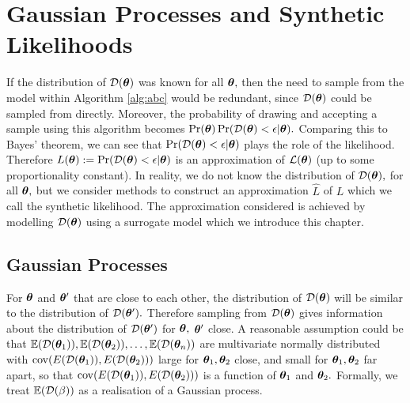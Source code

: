 \chapter{Gaussian Processes and Synthetic Likelihoods}

If the distribution of $\mathcal{D}(\bm{\theta})$ was known for all $\bm{\theta},$ then the need
to sample from the model within Algorithm
\ref{alg:abc} would be redundant, since $\mathcal{D}(\bm{\theta})$ could be sampled from
directly. Moreover, the probability of drawing and accepting a sample
using this algorithm becomes
$\Pr(\bm{\theta})\Pr(\mathcal{D}(\bm{\theta}) < \epsilon | \bm{\theta}).$ Comparing
this to Bayes' theorem, we can see that $\Pr(\mathcal{D}(\bm{\theta}) < \epsilon | \bm{\theta})$
plays the role of the likelihood. Therefore
$L(\bm{\theta}) := \Pr(\mathcal{D}(\bm{\theta}) < \epsilon | \bm{\theta})$
is an approximation of $\operatorname{\mathcal{L}}(\bm{\theta})$ (up to some proportionality constant).
In reality, we do not know the distribution of $\mathcal{D}(\bm{\theta}),$ for all
$\bm{\theta},$ but we consider methods to construct
an approximation $\hat{L}$ of $L$ which we call the synthetic likelihood.
The approximation considered is achieved by modelling
$\mathcal{D}(\bm{\theta})$ using a surrogate model which we introduce this chapter.

\section{Gaussian Processes}

For $\bm{\theta}$ and $\bm{\theta}^\prime$ that are close to each other,
the distribution of $\mathcal{D}(\bm{\theta})$ will be similar to the distribution of
$\mathcal{D}(\bm{\theta}^\prime).$ Therefore sampling from $\mathcal{D}(\bm{\theta})$ gives information
about the distribution of $\mathcal{D}(\bm{\theta}^\prime)$ for $\bm{\theta},$
$\bm{\theta}^\prime$ close. A reasonable assumption could be that
$\operatorname{\mathbb{E}}(\mathcal{D}(\bm{\theta}_1)), \operatorname{\mathbb{E}}(\mathcal{D}(\bm{\theta}_2)), \dots, \operatorname{\mathbb{E}}(\mathcal{D}(\bm{\theta}_n))$ are
multivariate
normally distributed with $\operatorname{cov}(E(\mathcal{D}(\bm{\theta}_1)), E(\mathcal{D}(\bm{\theta}_2)))$ large for
$\bm{\theta}_1, \bm{\theta}_2$ close, and small for $\bm{\theta}_1, \bm{\theta}_2$ far apart,
so that $\operatorname{cov}(E(\mathcal{D}(\bm{\theta}_1)), E(\mathcal{D}(\bm{\theta}_2)))$ is a function of $\bm{\theta}_1$
and $\bm{\theta}_2.$
Formally, we treat $\operatorname{\mathbb{E}}(\mathcal{D}(\beta))$ as a realisation of a Gaussian process.

